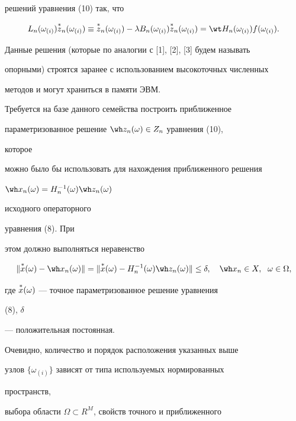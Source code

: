 решений уравнения (10) так, что


$$


L_n(\omega_{(i)})\up{*}{z}_n(\omega_{(i)})\equiv


\up{*}{z}_n(\omega_{(i)})-\lambda B_n(\omega_{(i)})


\up{*}{z}_n(\omega_{(i)})=


\wt H_n(\omega_{(i)})f(\omega_{(i)}).


$$


Данные решения (которые по аналогии с [1], [2], [3] будем называть


опорными) строятся заранее с использованием высокоточных численных


методов и могут храниться в памяти ЭВМ.





Требуется на базе данного семейства построить приближенное


параметризованное решение $\wh z_n(\omega)\in Z_n$ уравнения (10),


которое


можно было бы использовать для нахождения приближенного решения


$\wh x_n(\omega)=H^{-1}_n(\omega)\wh z_n(\omega)$


исходного операторного


уравнения (8). При


этом должно выполняться неравенство


$$


\|\up{*}{x}(\omega)-\wh x_n(\omega)\|=\|\up{*}{x}(\omega)-


H^{-1}_n(\omega)\wh z_n(\omega)\|\le\delta,\quad


\wh x_n\in X,\ \; \omega\in\Omega,


$$


где $\overset{*}{x}{}(\omega)$ --- точное параметризованное решение уравнения


(8), $\delta$


--- положительная постоянная.





Очевидно, количество и порядок расположения указанных выше


узлов $\{\omega_{(i)}\}$ зависят от типа используемых нормированных


пространств,


выбора области $\Omega\subset R^M$, свойств точного и приближенного


